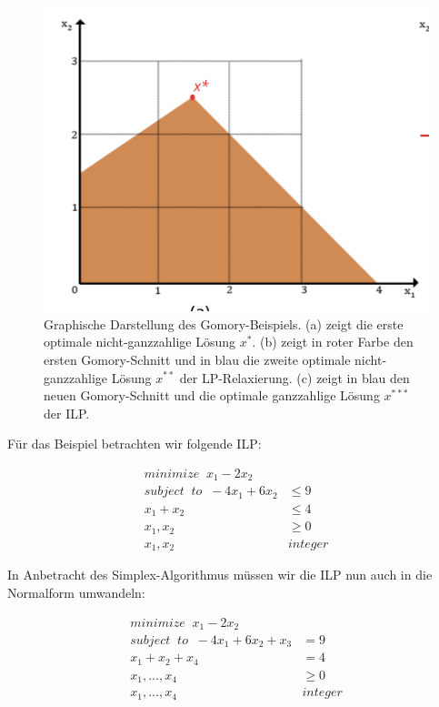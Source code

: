 \documentclass[tog]{acmsiggraph}
\begin{document}
\begin{figure}[t!]
  \centering
  \includegraphics[scale=0.40]{images/gomory-example}
  \caption{Graphische Darstellung des Gomory-Beispiels. (a) zeigt die erste optimale nicht-ganzzahlige Lösung $x^{*}$. (b) zeigt in roter Farbe den ersten Gomory-Schnitt und in blau die zweite optimale nicht-ganzzahlige Lösung $x^{**}$ der LP-Relaxierung. (c) zeigt in blau den neuen Gomory-Schnitt und die optimale ganzzahlige Lösung $x^{***}$ der ILP. }
  \label{fig:gomory-example}
\end{figure}

Für das Beispiel betrachten wir folgende ILP:

\large
\begin{align}
\label{Eq:Gomory-Beispiel-ILP}
minimize \;\; x_1 - 2x_2 & \nonumber \\
subject \;\; to \;\; -4x_1 + 6x_2 &\leq 9 \nonumber \\
x_1 + x_2 &\leq 4 \nonumber \\
x_1, x_2 &\geq 0 \nonumber \\
x_1, x_2 \;\; &integer
\end{align}
\normalsize

In Anbetracht des Simplex-Algorithmus müssen wir die ILP nun auch in die Normalform umwandeln:

\large
\begin{align}
\label{Eq:Gomory-Beispiel-ILP-Normal}
minimize \;\; x_1 - 2x_2 & \nonumber \\
subject \;\; to \;\; -4x_1 + 6x_2 + x_3 &= 9 \nonumber \\
x_1 + x_2 + x_4 &= 4 \nonumber \\
x_1, ..., x_4 &\geq 0 \nonumber \\
x_1, ..., x_4 \;\; &integer
\end{align}
\normalsize
\end{document}
